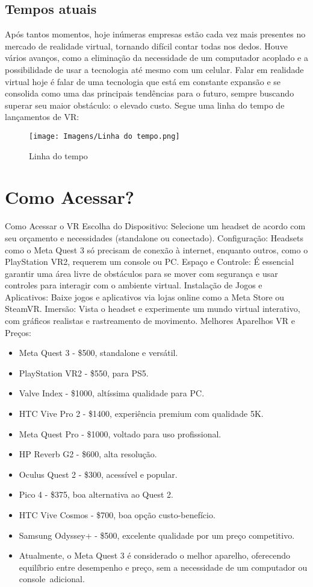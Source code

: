 \documentclass[article,a4paper,12pt,brazil,sumario=tradicional]{abntex2}
\begin{document}
        \subsection{Tempos atuais}
            Após tantos momentos, hoje inúmeras empresas estão cada vez mais presentes no mercado de realidade virtual, tornando difícil contar todas nos dedos. Houve vários avanços, como a eliminação da necessidade de um computador acoplado e a possibilidade de usar a tecnologia até mesmo com um celular. Falar em realidade virtual hoje é falar de uma tecnologia que está em constante expansão e se consolida como uma das principais tendências para o futuro, sempre buscando superar seu maior obstáculo: o elevado custo. Segue uma linha do tempo de lançamentos de VR:
            \begin{figure}[H]
                \centering
                \texttt{[image: Imagens/Linha do tempo.png]}
                \caption{Linha do tempo}
                \label{fig:enter-label}
            \end{figure}
\section{Como Acessar?}
        Como Acessar o VR
    Escolha do Dispositivo: Selecione um headset de acordo com seu orçamento e necessidades (standalone ou conectado).
    Configuração: Headsets como o Meta Quest 3 só precisam de conexão à internet, enquanto outros, como o PlayStation VR2, requerem um console ou PC.
    Espaço e Controle: É essencial garantir uma área livre de obstáculos para se mover com segurança e usar controles para interagir com o ambiente virtual.
    Instalação de Jogos e Aplicativos: Baixe jogos e aplicativos via lojas online como a Meta Store ou SteamVR.
    Imersão: Vista o headset e experimente um mundo virtual interativo, com gráficos realistas e rastreamento de movimento.
    Melhores Aparelhos VR e Preços:
    \begin{itemize}
    \item Meta Quest 3 - \$500, standalone e versátil.
    \item PlayStation VR2 - \$550, para PS5.
    \item Valve Index - \$1000, altíssima qualidade para PC.
    \item HTC Vive Pro 2 - \$1400, experiência premium com qualidade 5K.
    \item Meta Quest Pro - \$1000, voltado para uso profissional.
    \item HP Reverb G2 - \$600, alta resolução.
    \item Oculus Quest 2 - \$300, acessível e popular.
    \item Pico 4 - \$375, boa alternativa ao Quest 2.
    \item HTC Vive Cosmos - \$700, boa opção custo-benefício.
    \item Samsung Odyssey+ - \$500, excelente qualidade por um preço competitivo.
    \item Atualmente, o Meta Quest 3 é considerado o melhor aparelho, oferecendo equilíbrio entre  desempenho e preço, sem a necessidade de um computador ou console adicional.
    \end{itemize}
\end{document}
